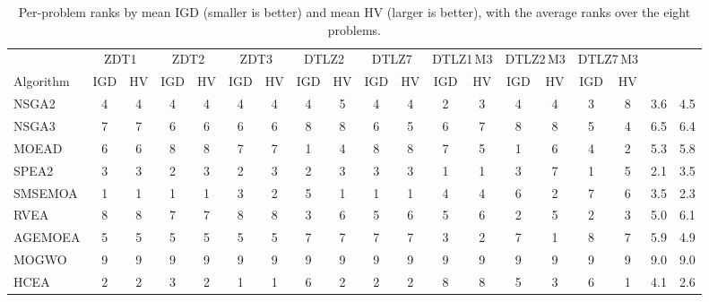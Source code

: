 \begin{table}[t]
\centering
\caption{Per-problem ranks by mean IGD (smaller is better) and mean HV (larger is better), with the average ranks over the eight problems.}
\label{tab:ranks}
\footnotesize
\setlength{\tabcolsep}{2.5pt}
\begin{tabular}{l@{\hspace{3pt}}cc@{\hspace{4pt}}cc@{\hspace{4pt}}cc@{\hspace{4pt}}cc@{\hspace{4pt}}cc@{\hspace{4pt}}cc@{\hspace{4pt}}cc@{\hspace{4pt}}cc@{\hspace{4pt}}cc}
\toprule
 & \multicolumn{2}{c}{ZDT1} & \multicolumn{2}{c}{ZDT2} & \multicolumn{2}{c}{ZDT3} & \multicolumn{2}{c}{DTLZ2} & \multicolumn{2}{c}{DTLZ7} & \multicolumn{2}{c}{DTLZ1\,M3} & \multicolumn{2}{c}{DTLZ2\,M3} & \multicolumn{2}{c}{DTLZ7\,M3} \\
 Algorithm & IGD & HV & IGD & HV & IGD & HV & IGD & HV & IGD & HV & IGD & HV & IGD & HV & IGD & HV \\
\midrule
NSGA2   & 4 & 4 & 4 & 4 & 4 & 4 & 4 & 5 & 4 & 4 & 2 & 3 & 4 & 4 & 3 & 8 & 3.6 & 4.5 \\
NSGA3   & 7 & 7 & 6 & 6 & 6 & 6 & 8 & 8 & 6 & 5 & 6 & 7 & 8 & 8 & 5 & 4 & 6.5 & 6.4 \\
MOEAD   & 6 & 6 & 8 & 8 & 7 & 7 & 1 & 4 & 8 & 8 & 7 & 5 & 1 & 6 & 4 & 2 & 5.3 & 5.8 \\
SPEA2   & 3 & 3 & 2 & 3 & 2 & 3 & 2 & 3 & 3 & 3 & 1 & 1 & 3 & 7 & 1 & 5 & 2.1 & 3.5 \\
SMSEMOA & 1 & 1 & 1 & 1 & 3 & 2 & 5 & 1 & 1 & 1 & 4 & 4 & 6 & 2 & 7 & 6 & 3.5 & 2.3 \\
RVEA    & 8 & 8 & 7 & 7 & 8 & 8 & 3 & 6 & 5 & 6 & 5 & 6 & 2 & 5 & 2 & 3 & 5.0 & 6.1 \\
AGEMOEA & 5 & 5 & 5 & 5 & 5 & 5 & 7 & 7 & 7 & 7 & 3 & 2 & 7 & 1 & 8 & 7 & 5.9 & 4.9 \\
MOGWO   & 9 & 9 & 9 & 9 & 9 & 9 & 9 & 9 & 9 & 9 & 9 & 9 & 9 & 9 & 9 & 9 & 9.0 & 9.0 \\
HCEA    & 2 & 2 & 3 & 2 & 1 & 1 & 6 & 2 & 2 & 2 & 8 & 8 & 5 & 3 & 6 & 1 & 4.1 & 2.6 \\
\bottomrule
\end{tabular}
\end{table}
